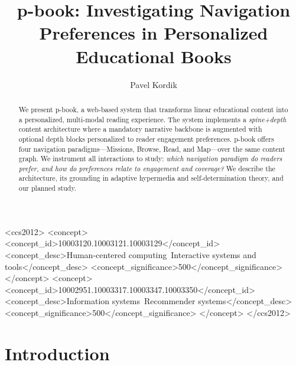 \documentclass[sigconf]{acmart}
\begin{document}
\title{p-book: Investigating Navigation Preferences in Personalized Educational Books}

\author{Pavel Kordik}


\begin{abstract}
We present p-book, a web-based system that transforms linear educational content into a personalized, multi-modal reading experience. The system implements a \emph{spine+depth} content architecture where a mandatory narrative backbone is augmented with optional depth blocks personalized to reader engagement preferences. p-book offers four navigation paradigms---Missions, Browse, Read, and Map---over the same content graph. We instrument all interactions to study: \emph{which navigation paradigm do readers prefer, and how do preferences relate to engagement and coverage?} We describe the architecture, its grounding in adaptive hypermedia and self-determination theory, and our planned study.
\end{abstract}

\begin{CCSXML}
<ccs2012>
<concept>
<concept_id>10003120.10003121.10003129</concept_id>
<concept_desc>Human-centered computing~Interactive systems and tools</concept_desc>
<concept_significance>500</concept_significance>
</concept>
<concept>
<concept_id>10002951.10003317.10003347.10003350</concept_id>
<concept_desc>Information systems~Recommender systems</concept_desc>
<concept_significance>500</concept_significance>
</concept>
</ccs2012>
\end{CCSXML}



\maketitle

\section{Introduction}
\end{document}
